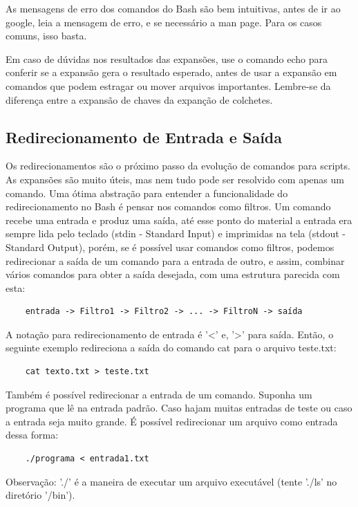 \documentclass[oneside, 11 pt]{article}
\begin{document}
	As mensagens de erro dos comandos do Bash são bem intuitivas, antes de ir ao google, leia a mensagem de erro, e se necessário a man page. Para os casos comuns, isso basta.
	
	Em caso de dúvidas nos resultados das expansões, use o comando echo para conferir se a expansão gera o resultado esperado, antes de usar a expansão em comandos que podem estragar ou mover arquivos importantes. Lembre-se da diferença entre a expansão de chaves da expanção de colchetes.
	
	\subsection{Redirecionamento de Entrada e Saída}
	
	Os redirecionamentos são o próximo passo da evolução de comandos para scripts. As expansões são muito úteis, mas nem tudo pode ser resolvido com apenas um comando. Uma ótima abstração para entender a funcionalidade do redirecionamento no Bash é pensar nos comandos como filtros. Um comando recebe uma entrada e produz uma saída, até esse ponto do material a entrada era sempre lida pelo teclado (stdin - Standard Input) e imprimidas na tela (stdout - Standard Output), porém, se é possível usar comandos como filtros, podemos redirecionar a saída de um comando para a entrada de outro, e assim, combinar vários comandos para obter a saída desejada, com uma estrutura parecida com esta:
	
	\begin{lstlisting}
	entrada -> Filtro1 -> Filtro2 -> ... -> FiltroN -> saída
	\end{lstlisting}
	A notação para redirecionamento de entrada é '<' e, '>' para saída. Então, o seguinte exemplo redireciona a saída do comando cat para o arquivo teste.txt:
	
	\begin{lstlisting}
	cat texto.txt > teste.txt
	\end{lstlisting}
	Também é possível redirecionar a entrada de um comando. Suponha um programa que lê na entrada padrão. Caso hajam muitas entradas de teste ou caso a entrada seja muito grande. É possível redirecionar um arquivo como entrada dessa forma:
	
	\begin{lstlisting}
	./programa < entrada1.txt
	\end{lstlisting}
	Observação: './' é a maneira de executar um arquivo executável (tente './ls' no diretório '/bin').
	
\end{document}
